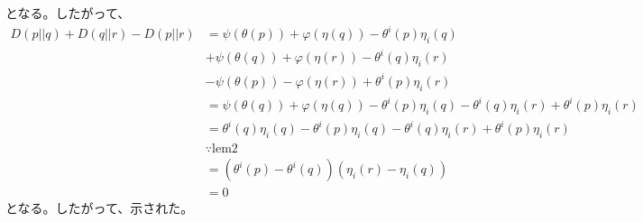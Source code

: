 \documentclass[a4paper,11pt]{jsarticle}
\numberwithin{equation}{section}
\begin{document}
    となる。したがって、
    \begin{align}
        D(p||q) + D(q||r) - D(p||r) &= \psi(\theta(p)) + \varphi(\eta(q)) - \theta^i(p)\eta_i(q) \\
        &+ \psi(\theta(q)) + \varphi(\eta(r)) - \theta^i(q)\eta_i(r) \\
        &- \psi(\theta(p)) - \varphi(\eta(r)) + \theta^i(p)\eta_i(r) \\
        &= \psi(\theta(q)) + \varphi(\eta(q)) - \theta^i(p)\eta_i(q) -\theta^i(q)\eta_i(r) + \theta^i(p)\eta_i(r) \\
        &= \theta^i(q)\eta_i(q) - \theta^i(p)\eta_i(q) -\theta^i(q)\eta_i(r) + \theta^i(p)\eta_i(r) \\
        &\because \text{lem2} \\
        &= (\theta^i(p)-\theta^i(q))(\eta_i(r) - \eta_i(q))\\
        &= 0
    \end{align}
    となる。したがって、示された。\hfill\qedsymbol
\end{document}
